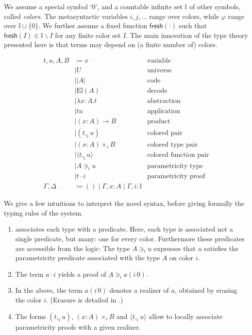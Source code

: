 \documentclass[english]{PaperTools/latex/lipics}
\newcommand\CP[3]{(#2,_{#1} #3)}
\newcommand\CTimes[2]{(#2) ×_{#1}}
\newcommand\param[1]{\!\cdot\!#1}
\newcommand\op[1]{∋_{#1}}
\newcommand\fp[3]{⟨#2 ,_{#1} #3⟩}
\newcommand\mor[2]{({#1}\,{#2})}
\newcommand\proj[2]{{#2}\mor{#1}0}
\def\fresh#1{\mathsf{fresh}(#1)}
\def\El#1{\mathrm{El}(#1)}
\begin{document}
We assume a special symbol ‘0’, and a countable infinite set $𝕀$ of
other symbols, called \emph{colors}.
The metasyntactic variables $i,j,\ldots$ range over colors,
while $φ$ range over $𝕀 ∪ \{0\}$.
We further assume a fixed function $\fresh{·}$ such that
$\fresh{I} ∈ 𝕀 \backslash I$ for any finite color set $I$.
%
The main innovation of the type theory
presented here is that terms may depend on (a finite number of)
colors.
\begin{definition}
  \begin{align*}
    t,u,A,B & \coloneqq x & \text {variable} \\
            & \mid U & \text{universe} \\ 
            & \mid |A| & \text{code} \\ 
            & \mid \El{A} & \text{decode} \\
            & \mid λx:A. t & \text{abstraction} \\
            & \mid t u & \text{application} \\ 
            & \mid (x:A) → B & \text{product} \\
            & \mid \CP i t u & \text{colored pair} \\
            & \mid \CTimes i {x:A} B  & \text{colored type pair} \\
            & \mid \fp i t u & \text{colored function pair}\\
            & \mid A \op i u & \text{parametricity type} \\
            & \mid t \param i & \text{parametricity proof} \\
    \Gamma,\Delta & \coloneqq () \mid \Gamma,x:A \mid \Gamma,i:𝕀
  \end{align*}
\end{definition}

We give a few intuitions to interpret the novel syntax, before giving formally the typing rules of the system. 
\begin{enumerate}
\item \citet{reynolds_types_1983} associates each type with a
  predicate. Here, each type is associated not a single predicate, but
  many: one for every color. Furthermore these predicates are accessible
  from the logic: The type $A \op i u$ expresses that $u$ satisfies
  the parametricity predicate associated with the type $A$ on color
  $i$.
\item The term $a \param i$ yields a proof of $A \op i \proj i a$.
\item In the above, the term $\proj i a$ denotes a realizer of $a$,
  obtained by erasing the color $i$. (Erasure is detailed in
  .)
\item The forms $\CP i t u$, $\CTimes i {x:A} B$ and $\fp i t u$ allow to
  locally associate parametricity proofs with a given realizer.
\end{enumerate}
\end{document}
